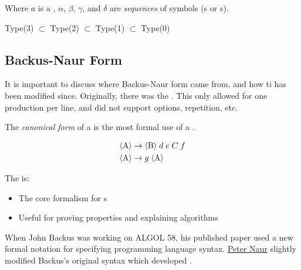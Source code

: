 \begin{remark*}
  Where $a$ is a , $\alpha$, $\beta$, $\gamma$, and $\delta$ are \emph{sequences} of symbols (s or s).

  Type(3) $\subset$ Type(2) $\subset$ Type(1) $\subset$ Type(0)
\end{remark*}

\subsection{Backus-Naur Form}\label{subsec:BNF}
It is important to discuss where Backus-Naur form came from, and how ti has been modified since.
Originally, there was the .
This only allowed for one production per line, and did not support options, repetition, etc.
\begin{definition}\label{def:CFG_Canonical_Form}
  The \emph{canonical form} of a  is the most formal use of a .

  \begin{equation}\label{eq:CFG_Canonical_Form}
    \begin{aligned}
      \langle \text{A} \rangle &\rightarrow \langle \text{B} \rangle \; d \; e \; C \; f \\
      \langle \text{A} \rangle &\rightarrow g \; \langle \text{A} \rangle \\
    \end{aligned}
  \end{equation}

  The  is:
  \begin{itemize}[noitemsep]
  \item The core formalism for s
  \item Useful for proving properties and explaining algorithms
  \end{itemize}
\end{definition}

When John Backus was working on ALGOL 58, his published paper used a new formal notation for specifying programming language syntax.
\href{https://en.wikipedia.org/wiki/Peter_Naur}{Peter Naur} slightly modified Backus's original syntax which developed .

